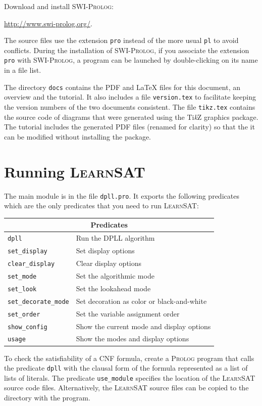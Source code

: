 \documentclass[11pt]{article}
\newcommand*{\p}[1]{\textup{\texttt{#1}}}
\newcommand*{\ls}{\textsc{LearnSAT}}
\newcommand*{\pl}{\textsc{Prolog}}
\newcommand*{\sw}{\textsc{SWI-Prolog}}
\begin{document}
Download and install \sw{}:
\begin{center}
\url{http://www.swi-prolog.org/}.
\end{center}

The source files use the extension \p{pro} instead of the more usual
\p{pl} to avoid conflicts. During the installation
of \sw{}, if you associate the extension \p{pro} with \sw{}, a
program can be launched by double-clicking on its name in a file list. 

The directory \p{docs} contains the PDF and \LaTeX{} files for this document, an overview and the tutorial. It also includes a file \p{version.tex} to facilitate keeping the version numbers of the two documents consistent. The file \p{tikz.tex} contains the source code of diagrams that were generated using the Ti\textit{k}Z graphics package. The tutorial includes the generated PDF files (renamed for clarity) so that the it can be modified without installing the package.


\section{Running \ls}

The main module is in the file \p{dpll.pro}. It exports the following
predicates which are the only predicates that you need to run \ls{}:

\begin{center}
\begin{tabular}{|l|l|}
\hline
\multicolumn{2}{|c|}{\textbf{\large Predicates}}\\
\hline
\p{dpll}&Run the DPLL algorithm\\
\p{set\_display}&Set display options\\
\p{clear\_display}&Clear display options\\
\p{set\_mode}&Set the algorithmic mode\\
\p{set\_look}&Set the lookahead mode\\
\p{set\_decorate\_mode} & Set decoration as color or black-and-white\\ 
\p{set\_order}&Set the variable assignment order\\
\p{show\_config}&Show the current mode and display options\\
\p{usage}&Show the modes and display options \\
\hline
\end{tabular}
\end{center}

To check the satisfiability of a CNF formula, create a \pl{} program
that calls the predicate \p{dpll} with the clausal form of the formula
represented as a list of lists of literals. The predicate \p{use\_module} specifies the location of the \ls{} source code files. Alternatively, the \ls{} source files can be copied to the directory with the program.
\end{document}
